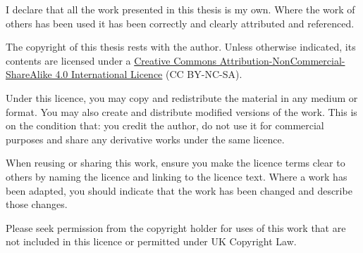 I declare that all the work presented in this thesis is my own. Where the work
of others has been used it has been correctly and clearly attributed and
referenced.

The copyright of this thesis rests with the author. Unless otherwise indicated,
its contents are licensed under a
\href{https://creativecommons.org/licenses/by-nc-sa/4.0/}{Creative Commons
Attribution-NonCommercial-ShareAlike 4.0 International Licence} (CC BY-NC-SA).

Under this licence, you may copy and redistribute the material in any medium or
format. You may also create and distribute modified versions of the work. This
is on the condition that: you credit the author, do not use it for commercial
purposes and share any derivative works under the same licence.

When reusing or sharing this work, ensure you make the licence terms clear to
others by naming the licence and linking to the licence text. Where a work has
been adapted, you should indicate that the work has been changed and describe
those changes.

Please seek permission from the copyright holder for uses of this work that are
not included in this licence or permitted under UK Copyright Law.

